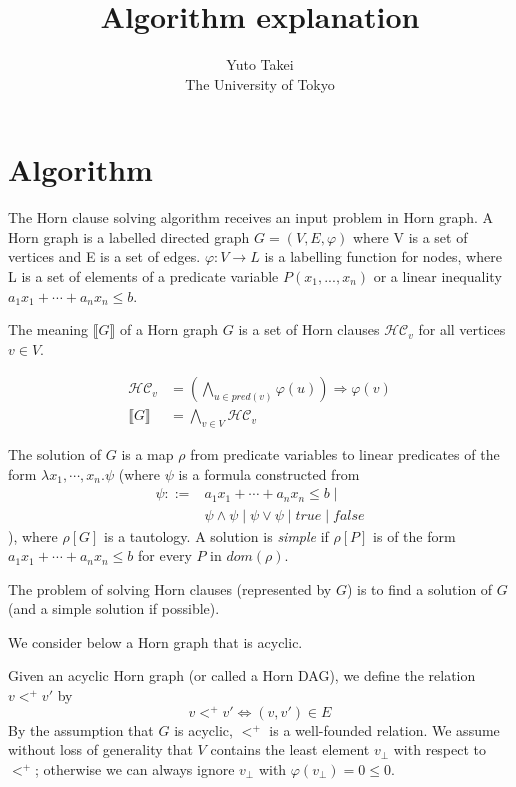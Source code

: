 \documentclass[a4paper,12pt]{article}
\title{Algorithm explanation}
\author{Yuto Takei \\ The University of Tokyo}
\begin{document}
\maketitle

\section{Algorithm}

The Horn clause solving algorithm receives an input problem in Horn
graph. A Horn graph is a labelled directed graph $G=(V,E,\varphi)$
where V is a set of vertices and E is a set of edges. $\varphi: V
\rightarrow L$ is a labelling function for nodes, where L is a set of
elements of a predicate variable $P(x_1, ..., x_n)$ or a linear
inequality $a_1 x_1 + \cdots + a_n x_n \leq b$.

The meaning $\llbracket G \rrbracket $ of a Horn graph $G$ is a set of
Horn clauses $\mathcal{HC}_v$ for all vertices $v \in V$.

\begin{align*}
\mathcal{HC}_v &= \left( \bigwedge_{u \in pred(v)} \varphi(u) \right)
\Longrightarrow \varphi(v) \\ \llbracket G \rrbracket &= \bigwedge_{v
  \in V} \mathcal{HC}_v
\end{align*}

The solution of $G$ is a map $\rho$ from predicate variables to linear
predicates of the form $\lambda x_1, \cdots ,x_n. \psi $ (where $\psi$
is a formula constructed from
\begin{align*}
\psi ::= & a_1 x_1 + \cdots + a_n x_n \leq b \mid \\
& \psi \wedge \psi \mid \psi \vee \psi \mid true \mid false
\end{align*}
), where $\rho[G]$ is a tautology. A solution is \textit{simple} if
$\rho[P]$ is of the form $a_1 x_1 + \cdots + a_n x_n \leq b$ for every
$P$ in $dom(\rho)$.

The problem of solving Horn clauses (represented by $G$) is to find a
solution of $G$ (and a simple solution if possible).

We consider below a Horn graph that is acyclic.

Given an acyclic Horn graph (or called a Horn DAG), we define the
relation $v <^+ v'$ by
\[ v <^+ v' \Longleftrightarrow (v,v') \in E \]
By the assumption that $G$ is acyclic, $<^+$ is a well-founded
relation.  We assume without loss of generality that $V$ contains the
least element $v_\bot$ with respect to $<^+$; otherwise we can always
ignore $v_\bot$ with $\varphi(v_\bot) = 0 \leq 0$.
\end{document}
